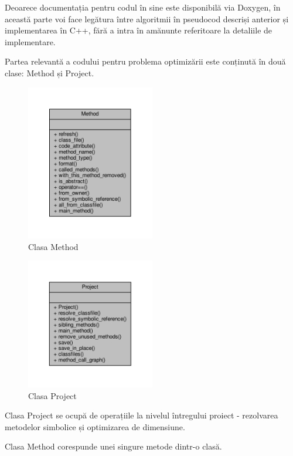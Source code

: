 Deoarece documentația pentru codul în sine este disponibilă via Doxygen, în
această parte voi face legătura între algoritmii în pseudocod descriși anterior
și implementarea în C++, fără a intra în amănunte referitoare la detaliile de
implementare.

Partea relevantă a codului pentru problema optimizării este conținută în
două clase: Method și Project.

\begin{figure}[H]
	\centering
	\includegraphics[width=0.5\textwidth]{classMethod__coll__graph}
	\caption{Clasa Method}
    \label{fig:classmethod}
\end{figure}

\begin{figure}[H]
	\centering
	\includegraphics[width=0.5\textwidth]{classProject__coll__graph}
	\caption{Clasa Project}
    \label{fig:classproject}
\end{figure}


Clasa Project se ocupă de operațiile la nivelul întregului proiect - rezolvarea
metodelor simbolice și optimizarea de dimensiune.

Clasa Method corespunde unei singure metode dintr-o clasă.

